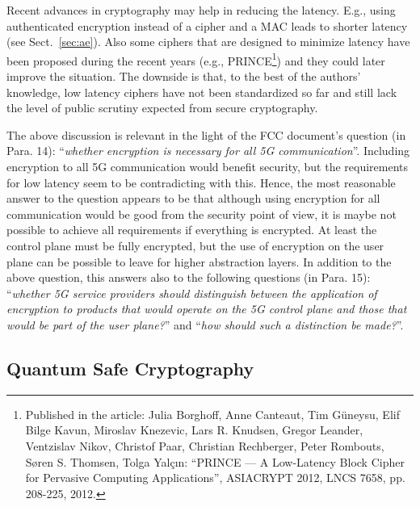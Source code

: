 \documentclass[12pt]{llncs}
\newcommand\ques[1]{``\emph{#1}''}
\begin{document}
Recent advances in cryptography may help in reducing the latency. E.g., using authenticated encryption instead of a cipher and a MAC leads to shorter latency (see Sect.~\ref{sec:ae}). Also some ciphers that are designed to minimize latency have been proposed during the recent years (e.g., PRINCE\footnote{Published in the article: Julia Borghoff, Anne Canteaut, Tim Güneysu, Elif Bilge Kavun, Miroslav Knezevic, Lars R. Knudsen, Gregor Leander, Ventzislav Nikov, Christof Paar, Christian Rechberger, Peter Rombouts, Søren S. Thomsen, Tolga Yalçın: ``PRINCE --- A Low-Latency Block Cipher for Pervasive Computing Applications'', ASIACRYPT 2012, LNCS 7658, pp. 208-225, 2012.}) and they could later improve the situation. The downside is that, to the best of the authors' knowledge, low latency ciphers have not been standardized so far and still lack the level of public scrutiny expected from secure cryptography.

The above discussion is relevant in the light of the FCC document's question (in Para. 14): \ques{whether encryption is necessary for all 5G communication}. Including encryption to all 5G communication would benefit security, but the requirements for low latency seem to be contradicting with this. Hence, the most reasonable answer to the question appears to be that although using encryption for all communication would be good from the security point of view, it is maybe not possible to achieve all requirements if everything is encrypted. At least the control plane must be fully encrypted, but the use of encryption on the user plane can be possible to leave for higher abstraction layers. In addition to the above question, this answers also to the following questions (in Para. 15): \ques{whether 5G service providers should distinguish between the application of encryption to products that would operate on the 5G control plane and those that would be part of the user plane?} and \ques{how should such a distinction be made?}.

\subsection{Quantum Safe Cryptography}
\label{sec:qsc}
\end{document}
